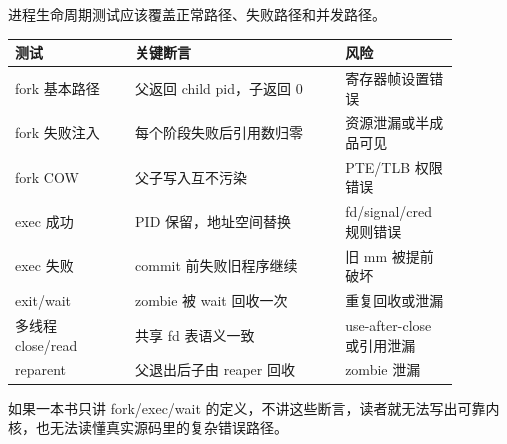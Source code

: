 进程生命周期测试应该覆盖正常路径、失败路径和并发路径。

\begin{longtable}{|p{0.24\linewidth}|p{0.42\linewidth}|p{0.22\linewidth}|}
\toprule
测试 & 关键断言 & 风险 \\
\midrule
fork 基本路径 & 父返回 child pid，子返回 0 & 寄存器帧设置错误 \\\tablerowrule
fork 失败注入 & 每个阶段失败后引用数归零 & 资源泄漏或半成品可见 \\\tablerowrule
fork COW & 父子写入互不污染 & PTE/TLB 权限错误 \\\tablerowrule
exec 成功 & PID 保留，地址空间替换 & fd/signal/cred 规则错误 \\\tablerowrule
exec 失败 & commit 前失败旧程序继续 & 旧 mm 被提前破坏 \\\tablerowrule
exit/wait & zombie 被 wait 回收一次 & 重复回收或泄漏 \\\tablerowrule
多线程 close/read & 共享 fd 表语义一致 & use-after-close 或引用泄漏 \\\tablerowrule
reparent & 父退出后子由 reaper 回收 & zombie 泄漏 \\
\bottomrule
\end{longtable}

如果一本书只讲 fork/exec/wait 的定义，不讲这些断言，读者就无法写出可靠内核，也无法读懂真实源码里的复杂错误路径。
